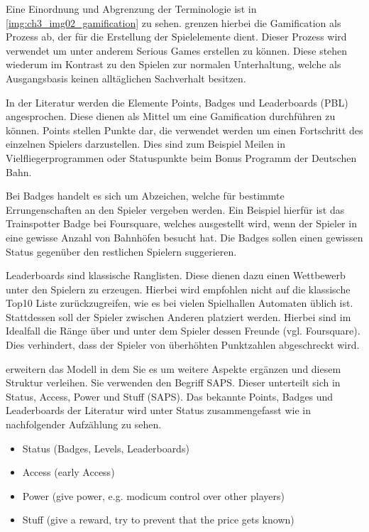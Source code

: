 Eine Einordnung und Abgrenzung der Terminologie ist in \ref{img:ch3_img02_gamification} zu sehen. \textcite{Deterding.2011} grenzen hierbei die Gamification als Prozess ab, der für die Erstellung der Spielelemente dient. Dieser Prozess wird verwendet um unter anderem Serious Games erstellen zu können. Diese stehen wiederum im Kontrast zu den Spielen zur normalen Unterhaltung, welche als Ausgangsbasis keinen alltäglichen Sachverhalt besitzen.

In der Literatur werden die Elemente Points, Badges und Leaderboards (PBL) angesprochen. Diese dienen als Mittel um eine Gamification durchführen zu können. 
Points stellen Punkte dar, die verwendet werden um einen Fortschritt des einzelnen Spielers darzustellen. Dies sind zum Beispiel Meilen in Vielfliegerprogrammen oder Statuspunkte beim Bonus Programm der Deutschen Bahn.

Bei Badges handelt es sich um Abzeichen, welche für bestimmte Errungenschaften an den Spieler vergeben werden. Ein Beispiel hierfür ist das Trainspotter Badge bei Foursquare, welches ausgestellt wird, wenn der Spieler in eine gewisse Anzahl von Bahnhöfen besucht hat. Die Badges sollen einen gewissen Status gegenüber den restlichen Spielern suggerieren.

Leaderboards sind klassische Ranglisten. Diese dienen dazu einen Wettbewerb unter den Spielern zu erzeugen. Hierbei wird empfohlen nicht auf die klassische Top10 Liste zurückzugreifen, wie es bei vielen Spielhallen Automaten üblich ist. Stattdessen soll der Spieler zwischen Anderen platziert werden. Hierbei sind im Idealfall die Ränge über und unter dem Spieler dessen Freunde (vgl. Foursquare). Dies verhindert, dass der Spieler von überhöhten Punktzahlen abgeschreckt wird.

\textcite{Zichermann.2011} erweitern das Modell in dem Sie es um weitere Aspekte ergänzen und diesem Struktur verleihen.
Sie verwenden den Begriff SAPS. Dieser unterteilt sich in Status, Access, Power und Stuff (SAPS).
Das bekannte Points, Badges und Leaderboards der Literatur wird unter Status zusammengefasst wie in nachfolgender Aufzählung zu sehen.

\begin{itemize}
\item Status (Badges, Levels, Leaderboards)
\item Access (early Access)
\item Power (give power, e.g. modicum control over other players)
\item Stuff (give a reward, try to prevent that the price gets known)
\end{itemize}

